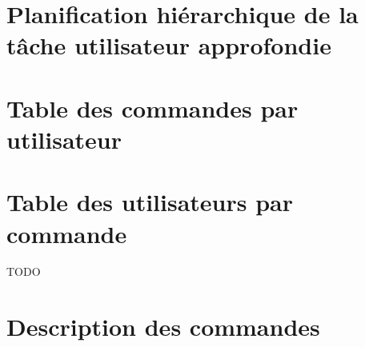 \part{Planification hiérarchique de la tâche utilisateur approfondie}

\part{Table des commandes par utilisateur}

\part{Table des utilisateurs par commande}
\begin{Huge}
TODO
\end{Huge}
\part{Description des commandes}

